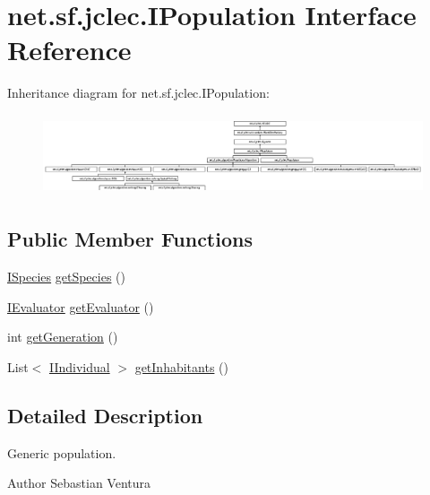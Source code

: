 \hypertarget{interfacenet_1_1sf_1_1jclec_1_1_i_population}{\section{net.\-sf.\-jclec.\-I\-Population Interface Reference}
\label{interfacenet_1_1sf_1_1jclec_1_1_i_population}
}
Inheritance diagram for net.\-sf.\-jclec.\-I\-Population\-:\begin{figure}[H]
\begin{center}
\leavevmode
\includegraphics[height=2.397004cm]{interfacenet_1_1sf_1_1jclec_1_1_i_population}
\end{center}
\end{figure}
\subsection*{Public Member Functions}
\begin{DoxyCompactItemize}
\item 
\hyperlink{interfacenet_1_1sf_1_1jclec_1_1_i_species}{I\-Species} \hyperlink{interfacenet_1_1sf_1_1jclec_1_1_i_population_a7147f7f250f94a395b5e712028eedce4}{get\-Species} ()
\item 
\hyperlink{interfacenet_1_1sf_1_1jclec_1_1_i_evaluator}{I\-Evaluator} \hyperlink{interfacenet_1_1sf_1_1jclec_1_1_i_population_a78237e3d50542f0162bf13d7822d000d}{get\-Evaluator} ()
\item 
int \hyperlink{interfacenet_1_1sf_1_1jclec_1_1_i_population_ac2127430d5cc2a325709165006888486}{get\-Generation} ()
\item 
List$<$ \hyperlink{interfacenet_1_1sf_1_1jclec_1_1_i_individual}{I\-Individual} $>$ \hyperlink{interfacenet_1_1sf_1_1jclec_1_1_i_population_a517e01d663ff3102b555daa5a33befab}{get\-Inhabitants} ()
\end{DoxyCompactItemize}


\subsection{Detailed Description}
Generic population.

\begin{DoxyAuthor}{Author}
Sebastian Ventura 
\end{DoxyAuthor}


